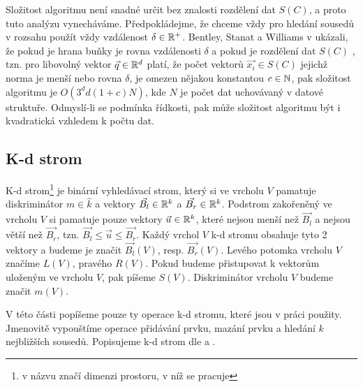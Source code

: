 Složitost algoritmu  není snadné určit bez znalosti rozdělení dat $S(C)$, a proto tuto analýzu vynecháváme. Předpokládejme, že chceme vždy pro hledání sousedů v rozsahu použít vždy vzdálenost $\delta \in \mathbb{R}^+$. Bentley, Stanat a Williams v \cite{cll-complexity} ukázali, že pokud je hrana buňky  je rovna vzdálenosti $\delta$ a pokud je rozdělení dat $S(C)$ , tzn. pro libovolný vektor $\vec{q} \in \mathbb{R}^d$ platí, že počet vektorů $\vec{x_i} \in S(C)$ jejichž norma je menší nebo rovna $\delta$, je omezen nějakou konstantou $c \in \mathbb{N}$, pak složitost algoritmu  je $O(3^dd(1+c)N)$, kde $N$ je počet dat uchovávaný v datové struktuře. Odmyslí-li se podmínka řídkosti, pak může složitost algoritmu být i kvadratická vzhledem k počtu dat.

\subsection{K-d strom}

K-d strom\footnote{ v názvu značí dimenzi prostoru, v níž se pracuje} je binární vyhledávací strom, který si ve vrcholu $V$ pamatuje diskriminátor $m \in \hat k$ a vektory $\vec{B_l} \in \mathbb{R}^k$ a $\vec{B_r} \in \mathbb{R}^k$. Podstrom zakořeněný ve vrcholu $V$ si pamatuje pouze vektory $\vec{u} \in \mathbb{R}^k$, které nejsou menší než $\vec{B_l}$ a nejsou větší než $\vec{B_r}$, tzn. $\vec{B_l} \leq \vec{u} \leq \vec{B_r}$. Každý vrchol $V$ k-d stromu obsahuje tyto 2 vektory a budeme je značit $\vec{B_l}(V)$, resp. $\vec{B_r}(V)$. Levého potomka vrcholu $V$ značíme $L(V)$, pravého $R(V)$. Pokud budeme přistupovat k vektorům uloženým ve vrcholu $V$, pak píšeme $S(V)$. Diskriminátor vrcholu $V$ budeme značit $m(V)$.

V této části popíšeme pouze ty operace k-d stromu, které jsou v práci použity. Jmenovitě vypouštíme operace přidávání prvku, mazání prvku a hledání $k$ nejbližších sousedů. Popisujeme k-d strom dle \cite{kd-tree} a \cite{kd-tree-optimized}.

